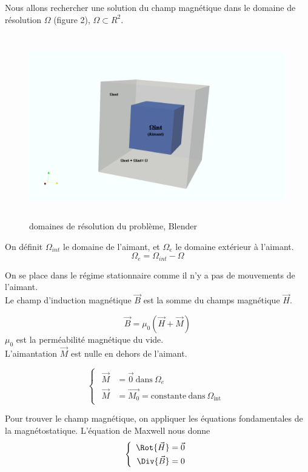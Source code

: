 \documentclass[a4paper,12pt,titlepage]{report}
\begin{document}
\begin{onehalfspace}
Nous allons rechercher une solution du champ magnétique dans le domaine de résolution $\Omega$ (figure 2), $\Omega \subset R^{2}$. \\
\begin{figure}[h]
\begin{center}
\includegraphics[height = 8cm, keepaspectratio]{graphes/Espacedetravail.png} 
\caption{domaines de résolution du problème, Blender}
\label{figure 2}
\end{center}
\end{figure}
On définit $\Omega_{int}$ le domaine de l'aimant, et $\Omega_{e}$ le domaine extérieur à l'aimant. 
\[\Omega_{e} = \Omega_{int} - \Omega\]

\newpage
On se place dans le régime stationnaire comme il n'y a pas de mouvements de l'aimant. \\
Le champ d'induction magnétique $\vec{B}$ est la somme du champs magnétique $\vec{H}$.

\[\vec{B}=\mu _{0}(\vec{H}+\vec{M})\]
$\mu _{0}$ est la perméabilité magnétique du vide. \\
L'aimantation $\vec{M}$ est nulle en dehors de l'aimant.
 
\[ 
\left\{
\begin{array}{ccc}
\begin{aligned}
	\vec{M} &= \vec{0} \  \text{dans} \ \Omega_{e} \\ 
	\vec{M} &= \vec{M_{0}} = \text{constante}  \ \text{dans}  \  \Omega_{\text{int}}
\end{aligned}
\end{array}
\right.
\]

Pour trouver le champ magnétique, on appliquer les équations fondamentales de la magnétostatique. L'équation de Maxwell nous donne 
\[
	\left\{
	\begin{array}{ccc}
	\begin{aligned}
		\Rot{\vec{H}} &= \vec {0} \\
		\Div{\vec{B}} &= 0
	\end{aligned}
	\end{array}
	\right.
\]


\end{onehalfspace}
\end{document}
